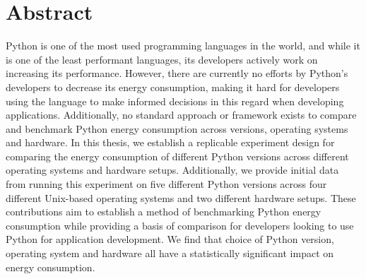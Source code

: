 \newpage
{}
\section*{Abstract}
\label{sec:abstract}

Python is one of the most used programming languages in the world, and while it is one of the least performant languages, its developers actively work on increasing its performance. However, there are currently no efforts by Python’s developers to decrease its energy consumption, making it hard for developers using the language to make informed decisions in this regard when developing applications. Additionally, no standard approach or framework exists to compare and benchmark Python energy consumption across versions, operating systems and hardware. In this thesis, we establish a replicable experiment design for comparing the energy consumption of different Python versions across different operating systems and hardware setups. Additionally, we provide initial data from running this experiment on five different Python versions across four different Unix-based operating systems and two different hardware setups. These contributions aim to establish a method of benchmarking Python energy consumption while providing a basis of comparison for developers looking to use Python for application development. We find that choice of Python version, operating system and hardware all have a statistically significant impact on energy consumption.
